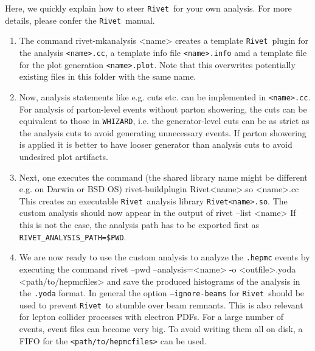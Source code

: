 \documentclass[12pt]{book}
\newenvironment{code}%
  {\begingroup\footnotesize
   \quote
   \Verbatim}%
  {\endVerbatim
   \endquote
   \endgroup\noindent}
\newcommand{\ttt}[1]{\texttt{#1}}
\newcommand{\whizard}{\ttt{WHIZARD}}
\newcommand{\rivet}{\ttt{Rivet}}
\begin{document}
Here, we quickly explain how to steer \rivet\ for your own
analysis. For more details, please confer the \rivet\ manual.
\begin{enumerate}
\item The command
  \begin{code}
    rivet-mkanalysis <name>
  \end{code}
  creates a template \rivet\ plugin for the analysis \ttt{<name>.cc},
  a template info file \ttt{<name>.info} amd a template file for the
  plot generation \ttt{<name>.plot}. Note that this overwrites
  potentially existing files in this folder with the same name.

\item
  Now, analysis statements like e.g. cuts etc. can be implemented in
  \ttt{<name>.cc}. For analysis of parton-level events without parton
  showering, the cuts can be equivalent to those in \whizard, i.e. the
  generator-level cuts can be as strict as the analysis cuts to avoid
  generating unnecessary events. If parton showering is applied it is
  better to have looser generator than analysis cuts to avoid
  undesired plot artifacts.

\item
  Next, one executes the command (the shared library name might be
  different e.g. on Darwin or BSD OS)
  \begin{code}
    rivet-buildplugin Rivet<name>.so <name>.cc
  \end{code}
  This creates an executable \rivet\ analysis library
  \ttt{Rivet<name>.so}. The custom analysis should now appear in the
  output of
  \begin{code}
    rivet --list <name>
  \end{code}
  If this is not the case, the analysis path has to be exported first
  as \ttt{RIVET\_ANALYSIS\_PATH=\$PWD}.

\item
  We are now ready to use the custom analysis to analyze the
  \ttt{.hepmc} events by executing the command
  \begin{code}
    rivet --pwd --analysis=<name> -o <outfile>.yoda <path/to/hepmcfiles>
  \end{code}
  and save the produced histograms of the analysis in the \ttt{.yoda}
  format. In general the option \ttt{--ignore-beams} for
  \rivet\ should be used to prevent \rivet\ to stumble over beam
  remnants. This is also relevant for lepton collider processes with
  electron PDFs. For a large number of events, event files can become
  very big. To avoid writing them all on disk, a FIFO for the
  \ttt{<path/to/hepmcfiles>} can be used.


\end{enumerate}
\end{document}
